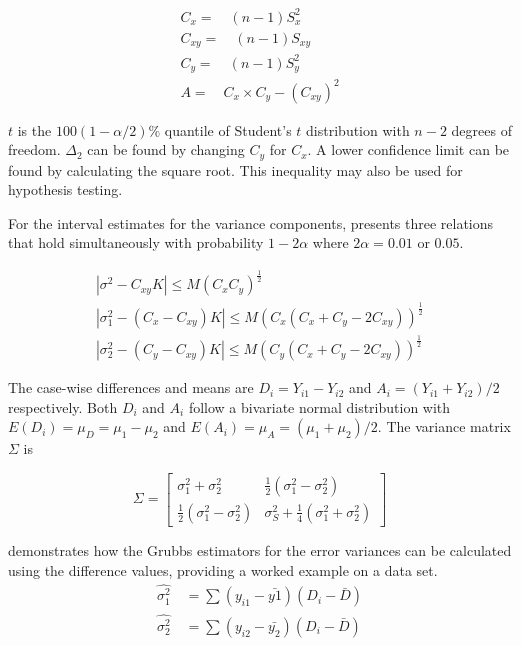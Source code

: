 \documentclass[12pt, a4paper]{report}
\theoremstyle{plain}
\theoremstyle{definition}
\theoremstyle{remark}
\begin{document}
	\begin{eqnarray}
	C_{x}=\quad(n-1)S^2_{x}\nonumber\\
	C_{xy}=\quad(n-1)S_{xy}\nonumber\\
	C_{y}=\quad(n-1)S^2_{y}\nonumber\\
	A=\quad C_{x}\times C_{y} - (C_{xy})^2 \nonumber
	\end{eqnarray}
	
	$t$ is the $100(1-\alpha/2)\%$ quantile of Student's $t$
	distribution with $n-2$ degrees of freedom. $\Delta_{2}$ can be
	found by changing $C_{y}$ for $C_{x}$. A lower confidence limit
	can be found by calculating the square root. This inequality may
	also be used for hypothesis testing.
	
	For the interval estimates for the variance components,
	\citet{Thompson} presents three relations that hold simultaneously
	with probability $1-2\alpha$ where $2\alpha=0.01$ or $0.05$.
	
	\begin{eqnarray}
	|\sigma^2-C_{xy}K|\leqslant M(C_{x}C_{y})^{\frac{1}{2}}\\
	|\sigma^2_{1}-(C_{x}-C_{xy})K|\leqslant M(C_{x}(C_{x}+C_{y}-2C_{xy}))^{\frac{1}{2}}\nonumber\\
	|\sigma^2_{2}-(C_{y}-C_{xy})K|\leqslant
	M(C_{y}(C_{x}+C_{y}-2C_{xy}))^{\frac{1}{2}}\nonumber
	\end{eqnarray}
	
	The case-wise differences and means are $D_{i} = Y_{i1}-Y_{i2}$
	and $A_{i} = (Y_{i1}+Y_{i2})/2$  respectively. Both $D_{i}$ and
	$A_{i}$ follow a bivariate normal distribution with $E(D_{i})=
	\mu_{D} = \mu_{1} - \mu_{2}$ and $E(A_{i})= \mu_{A} = (\mu_{1} +
	\mu_{2})/2$. The variance matrix $\Sigma$ is
	
	\begin{equation}
	\Sigma = \left[\begin{matrix}
	\sigma^{2}_{1}+\sigma^{2}_{2}&\frac{1}{2}(\sigma^{2}_{1}-\sigma^{2}_{2})\\
	\frac{1}{2}(\sigma^{2}_{1}-\sigma^{2}_{2})&\sigma^{2}_{S}+
	\frac{1}{4}(\sigma^{2}_{1}+\sigma^{2}_{2})
	\end{matrix} \right]
	\end{equation}
	
	
	
	
	
	\citet{Kinsella} demonstrates how the Grubbs estimators for the
	error variances can be calculated using the difference values,
	providing a worked example on a data set.
	\begin{eqnarray}
	\hat{\sigma^{2}_{1}}
	\quad=\sum{(y_{i1}-\bar{y{1}})(D_{i}-\bar{D})}\\
	\hat{\sigma^{2}_{2}} \quad=
	\sum{(y_{i2}-\bar{y_{2}})(D_{i}-\bar{D})} \nonumber
	\end{eqnarray}
	
\end{document}
